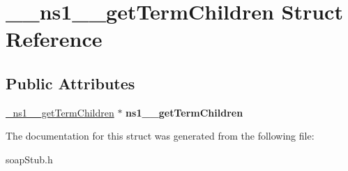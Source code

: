 \hypertarget{struct____ns1____getTermChildren}{
\section{\_\-\_\-ns1\_\-\_\-getTermChildren Struct Reference}
\label{struct____ns1____getTermChildren}
}
\subsection*{Public Attributes}
\begin{DoxyCompactItemize}
\item 
\hypertarget{struct____ns1____getTermChildren_a444fce09a2da3885908d06cf717fc759}{
\hyperlink{class__ns1____getTermChildren}{\_\-ns1\_\-\_\-getTermChildren} $\ast$ {\bfseries ns1\_\-\_\-getTermChildren}}
\label{struct____ns1____getTermChildren_a444fce09a2da3885908d06cf717fc759}

\end{DoxyCompactItemize}


The documentation for this struct was generated from the following file:\begin{DoxyCompactItemize}
\item 
soapStub.h\end{DoxyCompactItemize}
